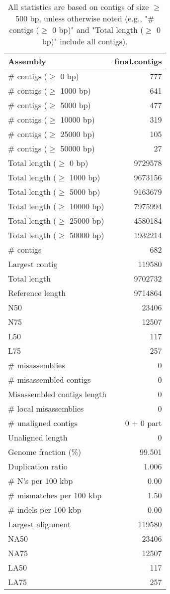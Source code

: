 \documentclass[12pt,a4paper]{article}
\begin{document}
\begin{table}[ht]
\begin{center}
\caption{All statistics are based on contigs of size $\geq$ 500 bp, unless otherwise noted (e.g., "\# contigs ($\geq$ 0 bp)" and "Total length ($\geq$ 0 bp)" include all contigs).}
\begin{tabular}{|l*{1}{|r}|}
\hline
Assembly & final.contigs \\ \hline
\# contigs ($\geq$ 0 bp) & 777 \\ \hline
\# contigs ($\geq$ 1000 bp) & 641 \\ \hline
\# contigs ($\geq$ 5000 bp) & 477 \\ \hline
\# contigs ($\geq$ 10000 bp) & 319 \\ \hline
\# contigs ($\geq$ 25000 bp) & 105 \\ \hline
\# contigs ($\geq$ 50000 bp) & 27 \\ \hline
Total length ($\geq$ 0 bp) & 9729578 \\ \hline
Total length ($\geq$ 1000 bp) & 9673156 \\ \hline
Total length ($\geq$ 5000 bp) & 9163679 \\ \hline
Total length ($\geq$ 10000 bp) & 7975994 \\ \hline
Total length ($\geq$ 25000 bp) & 4580184 \\ \hline
Total length ($\geq$ 50000 bp) & 1932214 \\ \hline
\# contigs & 682 \\ \hline
Largest contig & 119580 \\ \hline
Total length & 9702732 \\ \hline
Reference length & 9714864 \\ \hline
N50 & 23406 \\ \hline
N75 & 12507 \\ \hline
L50 & 117 \\ \hline
L75 & 257 \\ \hline
\# misassemblies & 0 \\ \hline
\# misassembled contigs & 0 \\ \hline
Misassembled contigs length & 0 \\ \hline
\# local misassemblies & 0 \\ \hline
\# unaligned contigs & 0 + 0 part \\ \hline
Unaligned length & 0 \\ \hline
Genome fraction (\%) & 99.501 \\ \hline
Duplication ratio & 1.006 \\ \hline
\# N's per 100 kbp & 0.00 \\ \hline
\# mismatches per 100 kbp & 1.50 \\ \hline
\# indels per 100 kbp & 0.00 \\ \hline
Largest alignment & 119580 \\ \hline
NA50 & 23406 \\ \hline
NA75 & 12507 \\ \hline
LA50 & 117 \\ \hline
LA75 & 257 \\ \hline
\end{tabular}
\end{center}
\end{table}
\end{document}

